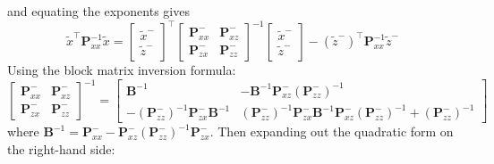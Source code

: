 \documentclass[11pt]{report} %
\begin{document}
and equating the exponents gives
\begin{equation}
\widetilde{x}^{\top}\mathbf{P}_{xx}^{-1}\widetilde{x} = \begin{bmatrix}\widetilde{x}^{-} \\ \widetilde{z}^{-}\end{bmatrix}^{\top}\begin{bmatrix} \mathbf{P}_{xx}^{-} & \mathbf{P}_{xz}^{-} \\ \mathbf{P}_{zx}^{-} & \mathbf{P}_{zz}^{-} \end{bmatrix}^{-1}\begin{bmatrix}\widetilde{x}^{-} \\ \widetilde{z}^{-}\end{bmatrix} - \left(\widetilde{z}^{-}\right)^{\top}\mathbf{P}_{xx}^{-1}\widetilde{z}^{-}
\end{equation}
Using the block matrix inversion formula:
\begin{equation}
\begin{bmatrix} \mathbf{P}_{xx}^{-} & \mathbf{P}_{xz}^{-} \\ \mathbf{P}_{zx}^{-} & \mathbf{P}_{zz}^{-} \end{bmatrix}^{-1} = \begin{bmatrix}\mathbf{B}^{-1} & -\mathbf{B}^{-1}\mathbf{P}_{xz}^{-}\left(\mathbf{P}_{zz}^{-}\right)^{-1}\\
-\left(\mathbf{P}_{zz}^{-}\right)^{-1}\mathbf{P}_{zx}^{-}\mathbf{B}^{-1} & \left(\mathbf{P}_{zz}^{-}\right)^{-1}\mathbf{P}_{zx}^{-}\mathbf{B}^{-1}\mathbf{P}_{xz}^{-}\left(\mathbf{P}_{zz}^{-}\right)^{-1}+\left(\mathbf{P}_{zz}^{-}\right)^{-1}
\end{bmatrix}
\end{equation}
where $\mathbf{B}^{-1}=\mathbf{P}_{xx}^{-}-\mathbf{P}_{xz}^{-}\left(\mathbf{P}_{zz}^{-}\right)^{-1}\mathbf{P}_{zx}^{-}$. Then expanding out the quadratic form on the right-hand side:
\end{document}
